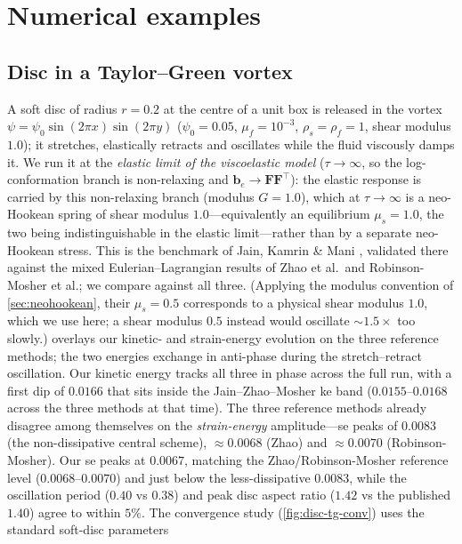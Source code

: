 \documentclass[final,3p,times]{elsarticle}
\theoremstyle{remark}
\newcommand{\Ften}{\bm{F}}              %
\newcommand{\be}{\bm{b}_e}              %
\begin{document}
\section{Numerical examples}
\label{sec:verification}

\subsection{Disc in a Taylor--Green vortex}
\label{sec:disc-tg}
A soft disc of radius $r=0.2$ at the centre of a unit box is released in the vortex
$\psi=\psi_0\sin(2\pi x)\sin(2\pi y)$ ($\psi_0=0.05$, $\mu_f=10^{-3}$, $\rho_s=\rho_f=1$, shear
modulus $1.0$); it stretches, elastically retracts and oscillates while the fluid
viscously damps it. We run it at the \emph{elastic limit of the viscoelastic model}
($\tau\to\infty$, so the log-conformation branch is non-relaxing and $\be\to\Ften\Ften^{\!\top}$):
the elastic response is carried by this non-relaxing branch (modulus $G=1.0$), which at
$\tau\to\infty$ is a neo-Hookean spring of shear modulus $1.0$---equivalently an equilibrium
$\mu_s=1.0$, the two being indistinguishable in the elastic limit---rather than by a separate
neo-Hookean stress. This is the benchmark of Jain, Kamrin \& Mani \cite{Jain2019}, validated
there against the mixed Eulerian--Lagrangian results of Zhao et al.\ and
Robinson-Mosher et al.; we compare against all three. (Applying the modulus convention of
\cref{sec:neohookean}, their $\mu_s=0.5$ corresponds to a physical shear modulus $1.0$, which we
use here; a shear modulus $0.5$ instead would oscillate ${\sim}1.5\times$ too slowly.)
 overlays our kinetic- and strain-energy evolution on the three
reference methods; the two energies exchange in anti-phase during the stretch--retract
oscillation. Our kinetic energy tracks all three in phase across the
full run, with a first dip of $0.0166$ that sits inside the Jain--Zhao--Mosher ke band
($0.0155$--$0.0168$ across the three methods at that time). The three reference methods already
disagree among themselves on the \emph{strain-energy} amplitude---se peaks of $0.0083$ (the
non-dissipative central scheme), ${\approx}0.0068$ (Zhao) and ${\approx}0.0070$
(Robinson-Mosher). Our se peaks at $0.0067$, matching the Zhao/Robinson-Mosher reference level
($0.0068$--$0.0070$) and just below the less-dissipative $0.0083$, while the oscillation period
($0.40$ vs $0.38$) and peak disc aspect ratio ($1.42$ vs the published $1.40$) agree to within
$5\%$.
The convergence study (\cref{fig:disc-tg-conv}) uses the standard soft-disc parameters
\end{document}
